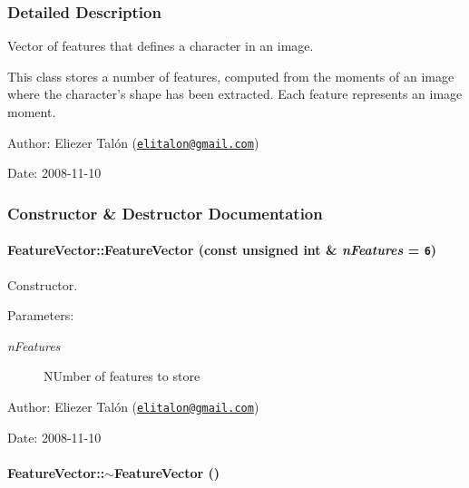 \subsubsection{Detailed Description}
Vector of features that defines a character in an image. 

This class stores a number of features, computed from the moments of an image where the character's shape has been extracted. Each feature represents an image moment.

\begin{Desc}
\item[Author:]Eliezer Talón (\href{mailto:elitalon@gmail.com}{\tt elitalon@gmail.com}) \end{Desc}
\begin{Desc}
\item[Date:]2008-11-10 \end{Desc}


\subsubsection{Constructor \& Destructor Documentation}
\hypertarget{class_feature_vector_bca3b0cdf84cf43d5bee90ba21a7a054}{
\paragraph[{FeatureVector}]{\setlength{\rightskip}{0pt plus 5cm}FeatureVector::FeatureVector (const unsigned int \& {\em nFeatures} = {\tt 6})}\hfill}
\label{class_feature_vector_bca3b0cdf84cf43d5bee90ba21a7a054}


Constructor. 

\begin{Desc}
\item[Parameters:]
\begin{description}
\item[{\em nFeatures}]NUmber of features to store\end{description}
\end{Desc}
\begin{Desc}
\item[Author:]Eliezer Talón (\href{mailto:elitalon@gmail.com}{\tt elitalon@gmail.com}) \end{Desc}
\begin{Desc}
\item[Date:]2008-11-10 \end{Desc}
\hypertarget{class_feature_vector_1b0407e6c3a5a0154a43e138972f7ee7}{
\paragraph[{$\sim$FeatureVector}]{\setlength{\rightskip}{0pt plus 5cm}FeatureVector::$\sim$FeatureVector ()}\hfill}
\label{class_feature_vector_1b0407e6c3a5a0154a43e138972f7ee7}


